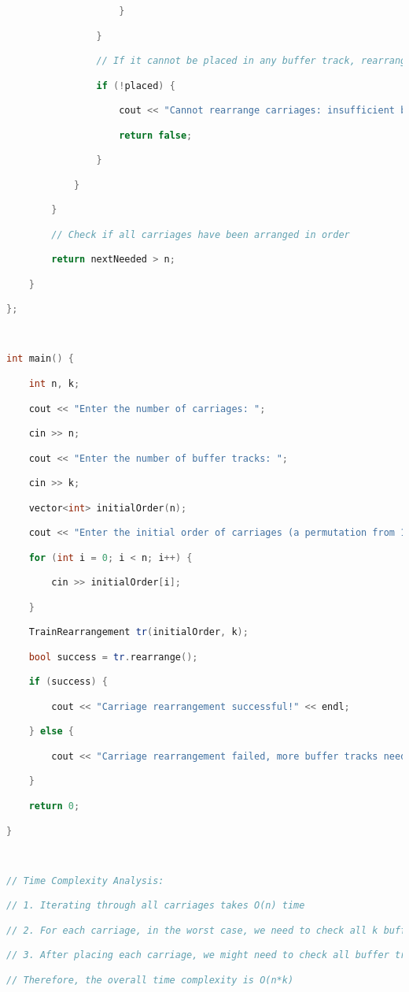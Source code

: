 \begin{lstlisting}[language=C++]
                    }

                }

                // If it cannot be placed in any buffer track, rearrangement fails

                if (!placed) {

                    cout << "Cannot rearrange carriages: insufficient buffer tracks" << endl;

                    return false;

                }

            }

        }

        // Check if all carriages have been arranged in order

        return nextNeeded > n;

    }

};

  

int main() {

    int n, k;

    cout << "Enter the number of carriages: ";

    cin >> n;

    cout << "Enter the number of buffer tracks: ";

    cin >> k;

    vector<int> initialOrder(n);

    cout << "Enter the initial order of carriages (a permutation from 1 to n): ";

    for (int i = 0; i < n; i++) {

        cin >> initialOrder[i];

    }

    TrainRearrangement tr(initialOrder, k);

    bool success = tr.rearrange();

    if (success) {

        cout << "Carriage rearrangement successful!" << endl;

    } else {

        cout << "Carriage rearrangement failed, more buffer tracks needed!" << endl;

    }

    return 0;

}

  

// Time Complexity Analysis:

// 1. Iterating through all carriages takes O(n) time

// 2. For each carriage, in the worst case, we need to check all k buffer tracks, which takes O(k) time

// 3. After placing each carriage, we might need to check all buffer tracks for carriages that can be moved out, which in the worst case takes O(k*n) time

// Therefore, the overall time complexity is O(n*k)
\end{lstlisting}